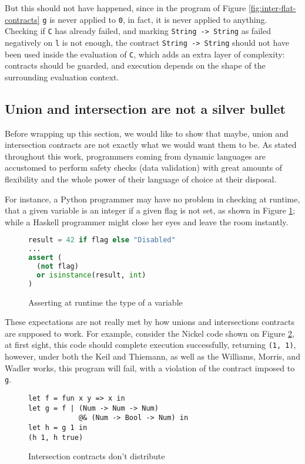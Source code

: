 \documentclass[sigplan,10pt,review,anonymous]{acmart}
\newcommand{\nickel}[1]{\lstinline[language=nickel]{#1}}
\begin{document}
But this should not have happened, since in the program of Figure \ref{fig:inter-flat-contracts}
\nickel{g} is never applied to \nickel{0}, in fact, it is never applied
to anything.
Checking if \nickel{C} has already failed, and marking \nickel{String -> String} as
failed negatively on \nickel{l} is not enough, the contract \nickel{String -> String}
should not have been used inside the evaluation of \nickel{C}, which
adds an extra layer of complexity: contracts should be guarded, and execution
depends on the shape of the surrounding evaluation context.

\subsection*{Union and intersection are not a silver bullet}

Before wrapping up this section, we would like to show that maybe, union and intersection
contracts are not exactly what we would want them to be.
As stated throughout this work, programmers coming from dynamic languages
are accustomed to perform safety checks (data validation) with
great amounts of flexibility and the whole power of their
language of choice at their disposal.

For instance, a Python programmer may have no problem in checking
at runtime, that a given variable is an integer if a given flag is
not set, as shown in Figure \ref{fig:python-assertion};
while a Haskell programmer might close her eyes and leave the room
instantly.

\begin{figure}[h]
\begin{lstlisting}[language=python]
result = 42 if flag else "Disabled"
...
assert (
  (not flag) 
  or isinstance(result, int)
)
\end{lstlisting}
\caption{Asserting at runtime the type of a variable}
\label{fig:python-assertion}
\end{figure}

These expectations are not really met by how unions and intersections
contracts are supposed to work.
For example, consider the Nickel code shown on Figure
\ref{fig:intersection-distrbution}, at first sight, this code should
complete execution successfully, returning \nickel{(1, 1)},
however, under both the Keil and Thiemann, as well as the
Williams, Morris, and Wadler works, this program will fail, with a violation
of the contract imposed to \nickel{g}.

\begin{figure}[h]
\begin{lstlisting}[language=nickel]
let f = fun x y => x in
let g = f | (Num -> Num -> Num)
            @& (Num -> Bool -> Num) in
let h = g 1 in
(h 1, h true)
\end{lstlisting}
\caption{Intersection contracts don't distribute}
\label{fig:intersection-distrbution}
\end{figure}
\end{document}
